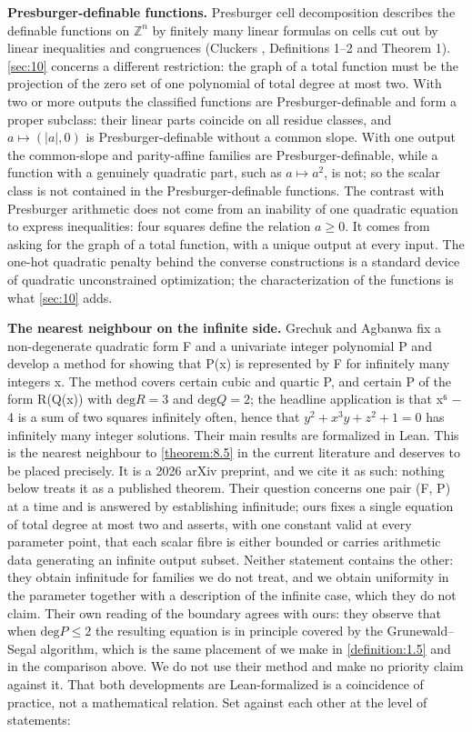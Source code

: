 \textbf{Presburger-definable functions.} Presburger cell decomposition describes the definable functions on $ℤ^{n}$ by finitely many linear formulas on cells cut out by linear inequalities and congruences (Cluckers \cite{Clu03}, Definitions 1–2 and Theorem 1). \cref{sec:10} concerns a different restriction: the graph of a total function must be the projection of the zero set of one polynomial of total degree at most two. With two or more outputs the classified functions are Presburger-definable and form a proper subclass: their linear parts coincide on all residue classes, and $a ↦ (|a|, 0)$ is Presburger-definable without a common slope. With one output the common-slope and parity-affine families are Presburger-definable, while a function with a genuinely quadratic part, such as $a ↦ a^{2}$, is not; so the scalar class is not contained in the Presburger-definable functions. The contrast with Presburger arithmetic does not come from an inability of one quadratic equation to express inequalities: four squares define the relation $a ≥ 0$. It comes from asking for the graph of a total function, with a unique output at every input. The one-hot quadratic penalty behind the converse constructions is a standard device of quadratic unconstrained optimization; the characterization of the functions is what \cref{sec:10} adds.

\textbf{The nearest neighbour on the infinite side.} Grechuk and Agbanwa \cite{GA26} fix a non-degenerate quadratic form F and a univariate integer polynomial P and develop a method for showing that P(x) is represented by F for infinitely many integers x. The method covers certain cubic and quartic P, and certain P of the form R(Q(x)) with $\mathrm{deg} R = 3$ and $\mathrm{deg} Q = 2$; the headline application is that x⁶ − 4 is a sum of two squares infinitely often, hence that $y^{2} + x^{3}y + z^{2} + 1 = 0$ has infinitely many integer solutions. Their main results are formalized in Lean. This is the nearest neighbour to \cref{theorem:8.5} in the current literature and deserves to be placed precisely. It is a 2026 arXiv preprint, and we cite it as such: nothing below treats it as a published theorem. Their question concerns one pair (F, P) at a time and is answered by establishing infinitude; ours fixes a single equation of total degree at most two and asserts, with one constant valid at every parameter point, that each scalar fibre is either bounded or carries arithmetic data generating an infinite output subset. Neither statement contains the other: they obtain infinitude for families we do not treat, and we obtain uniformity in the parameter together with a description of the infinite case, which they do not claim. Their own reading of the boundary agrees with ours: they observe that when $\mathrm{deg} P ≤ 2$ the resulting equation is in principle covered by the Grunewald–Segal algorithm, which is the same placement of \cite{GS04} we make in \cref{definition:1.5} and in the comparison above. We do not use their method and make no priority claim against it. That both developments are Lean-formalized is a coincidence of practice, not a mathematical relation. Set against each other at the level of statements:

